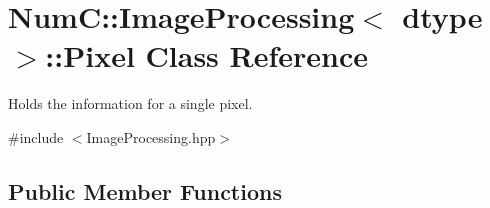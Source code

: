 \hypertarget{class_num_c_1_1_image_processing_1_1_pixel}{}\section{NumC\+:\+:Image\+Processing$<$ dtype $>$\+:\+:Pixel Class Reference}
\label{class_num_c_1_1_image_processing_1_1_pixel}


Holds the information for a single pixel.  




{\ttfamily \#include $<$Image\+Processing.\+hpp$>$}

\subsection*{Public Member Functions}
